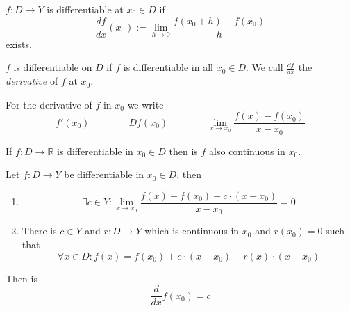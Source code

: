 \begin{definition}
   \(f: D \to Y\) is differentiable at \(x_0 \in D\) if
   \[\frac{df}{dx}(x_0) := \lim_{h \to 0} \frac{f(x_0 + h) - f(x_0)}{h}\]
   exists.
\end{definition}
\begin{remark}[Terminology]
   \(f\) is differentiable on \(D\) if \(f\) is differentiable in all \(x_0 \in D\).
   We call \(\frac{df}{dx}\) the \emph{derivative} of \(f\) at \(x_0\).
\end{remark}
\begin{remark}[Notation]
   For the derivative of \(f\) in \(x_0\) we write
   \[f'(x_0) \qquad\qquad Df(x_0) \qquad\qquad \lim_{x \to x_0} \frac{f(x) - f(x_0)}{x - x_0}\]
\end{remark}

\begin{proposition}\label{pro:deri_impl_cont}
   If \(f: D \to \mathbb{R}\) is differentiable in \(x_0 \in D\) then is \(f\) also continuous in \(x_0\).
\end{proposition}

\begin{proposition}
   Let \(f: D \to Y\) be differentiable in \(x_0 \in D\), then
   \begin{enumerate}[label=\roman*, align=Center]
      \item
         \[\exists c \in Y: \lim_{x \to x_0} \frac{f(x) - f(x_0) - c \cdot (x - x_0)}{x - x_0} = 0\]
      \item There is \(c \in Y\) and \(r: D \to Y\) which is continuous in \(x_0\) and \(r(x_0) = 0\) such that
         \[\forall x \in D: f(x) = f(x_0) + c \cdot (x - x_0) + r(x) \cdot (x - x_0)\]
   \end{enumerate}
   Then is
   \[\frac{d}{dx}f(x_0) = c\]
\end{proposition}
